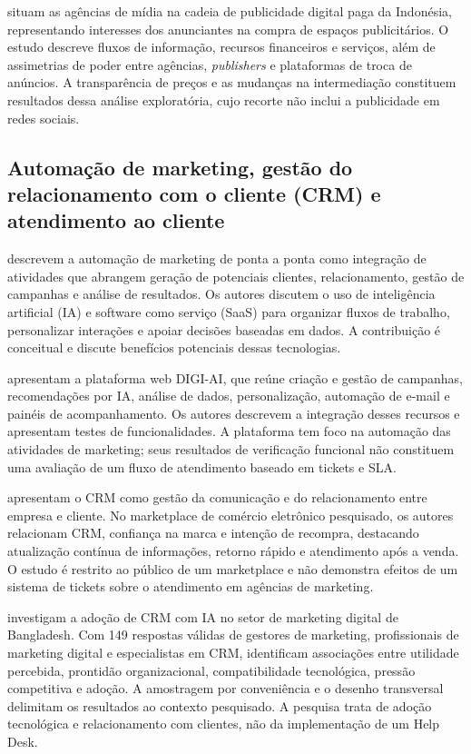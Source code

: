  situam as agências de mídia na cadeia de publicidade digital paga da Indonésia, representando interesses dos anunciantes na compra de espaços publicitários. O estudo descreve fluxos de informação, recursos financeiros e serviços, além de assimetrias de poder entre agências, \textit{publishers} e plataformas de troca de anúncios. A transparência de preços e as mudanças na intermediação constituem resultados dessa análise exploratória, cujo recorte não inclui a publicidade em redes sociais.

\subsection{\esp Automação de marketing, gestão do relacionamento com o cliente (CRM) e atendimento ao cliente}

 descrevem a automação de marketing de ponta a ponta como integração de atividades que abrangem geração de potenciais clientes, relacionamento, gestão de campanhas e análise de resultados. Os autores discutem o uso de inteligência artificial (IA) e software como serviço (SaaS) para organizar fluxos de trabalho, personalizar interações e apoiar decisões baseadas em dados. A contribuição é conceitual e discute benefícios potenciais dessas tecnologias.

 apresentam a plataforma web DIGI-AI, que reúne criação e gestão de campanhas, recomendações por IA, análise de dados, personalização, automação de e-mail e painéis de acompanhamento. Os autores descrevem a integração desses recursos e apresentam testes de funcionalidades. A plataforma tem foco na automação das atividades de marketing; seus resultados de verificação funcional não constituem uma avaliação de um fluxo de atendimento baseado em tickets e SLA.

 apresentam o CRM como gestão da comunicação e do relacionamento entre empresa e cliente. No marketplace de comércio eletrônico pesquisado, os autores relacionam CRM, confiança na marca e intenção de recompra, destacando atualização contínua de informações, retorno rápido e atendimento após a venda. O estudo é restrito ao público de um marketplace e não demonstra efeitos de um sistema de tickets sobre o atendimento em agências de marketing.

 investigam a adoção de CRM com IA no setor de marketing digital de Bangladesh. Com 149 respostas válidas de gestores de marketing, profissionais de marketing digital e especialistas em CRM, identificam associações entre utilidade percebida, prontidão organizacional, compatibilidade tecnológica, pressão competitiva e adoção. A amostragem por conveniência e o desenho transversal delimitam os resultados ao contexto pesquisado. A pesquisa trata de adoção tecnológica e relacionamento com clientes, não da implementação de um Help Desk.

